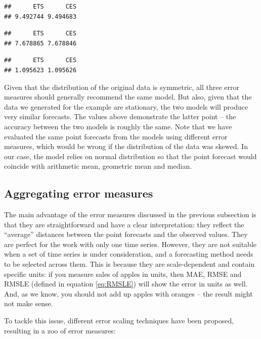 \documentclass[]{book}
\theoremstyle{definition}
\theoremstyle{definition}
\theoremstyle{definition}
\theoremstyle{definition}
\theoremstyle{remark}
\begin{document}
\begin{verbatim}
##      ETS      CES 
## 9.492744 9.494683
\end{verbatim}

\begin{verbatim}
##      ETS      CES 
## 7.678865 7.678846
\end{verbatim}

\begin{verbatim}
##      ETS      CES 
## 1.095623 1.095626
\end{verbatim}

Given that the distribution of the original data is symmetric, all three error measures should generally recommend the same model. But also, given that the data we generated for the example are stationary, the two models will produce very similar forecasts. The values above demonstrate the latter point -- the accuracy between the two models is roughly the same. Note that we have evaluated the same point forecasts from the models using different error measures, which would be wrong if the distribution of the data was skewed. In our case, the model relies on normal distribution so that the point forecast would coincide with arithmetic mean, geometric mean and median.

\hypertarget{errorMeasuresAggregate}{%
\subsection{Aggregating error measures}\label{errorMeasuresAggregate}}

The main advantage of the error measures discussed in the previous subsection is that they are straightforward and have a clear interpretation: they reflect the ``average'' distances between the point forecasts and the observed values. They are perfect for the work with only one time series. However, they are not suitable when a set of time series is under consideration, and a forecasting method needs to be selected across them. This is because they are scale-dependent and contain specific units: if you measure sales of apples in units, then MAE, RMSE and RMSLE (defined in equation \eqref{eq:RMSLE}) will show the error in units as well. And, as we know, you should not add up apples with oranges -- the result might not make sense.

To tackle this issue, different error scaling techniques have been proposed, resulting in a zoo of error measures:
\end{document}
